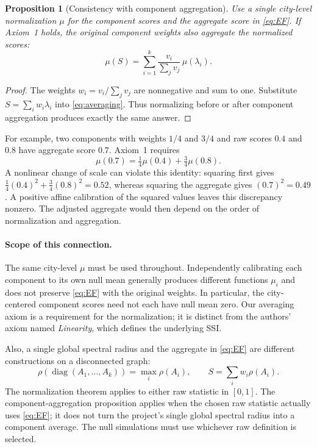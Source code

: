 \documentclass[11pt]{article}
\newtheorem{proposition}{Proposition}
\begin{document}
\begin{proposition}[Consistency with component aggregation]
Use a single city-level normalization $\mu$ for the component scores and the
aggregate score in \eqref{eq:EF}. If Axiom~1 holds, the original component
weights also aggregate the normalized scores:
\[
 \mu(S)=\sum_{i=1}^{k}\frac{v_i}{\sum_jv_j}\,\mu(\lambda_i).
\]
\end{proposition}
\begin{proof}
The weights $w_i=v_i/\sum_jv_j$ are nonnegative and sum to one. Substitute
$S=\sum_iw_i\lambda_i$ into \eqref{eq:averaging}. Thus normalizing before or
after component aggregation produces exactly the same answer.
\end{proof}

For example, two components with weights $1/4$ and $3/4$ and raw scores $0.4$
and $0.8$ have aggregate score $0.7$. Axiom~1 requires
\[
 \mu(0.7)=\tfrac14\mu(0.4)+\tfrac34\mu(0.8).
\]
A nonlinear change of scale can violate this identity: squaring first gives
$\tfrac14(0.4)^2+\tfrac34(0.8)^2=0.52$, whereas squaring the aggregate gives
$(0.7)^2=0.49$. A positive affine calibration of the squared values leaves
this discrepancy nonzero. The adjusted aggregate would then depend on the
order of normalization and aggregation.

\paragraph{Scope of this connection.}
The same city-level $\mu$ must be used throughout. Independently calibrating
each component to its own null mean generally produces different functions
$\mu_i$ and does not preserve \eqref{eq:EF} with the original weights. In
particular, the city-centered component scores need not each have null mean
zero. Our averaging axiom is a requirement for the normalization; it is distinct
from the authors' axiom named \emph{Linearity}, which defines the underlying SSI.

Also, a single global spectral radius and the aggregate in \eqref{eq:EF}
are different constructions on a disconnected graph:
\[
 \rho\!\left(\operatorname{diag}(A_1,\ldots,A_k)\right)
 =\max_i\rho(A_i),
 \qquad
 S=\sum_i w_i\rho(A_i).
\]
The normalization theorem applies to either raw statistic in $[0,1]$. The
component-aggregation proposition applies when the chosen raw statistic
actually uses \eqref{eq:EF}; it does not turn the project's single global
spectral radius into a component average. The null simulations must use
whichever raw definition is selected.
\end{document}
